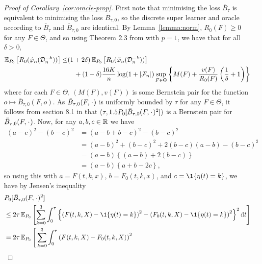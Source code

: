 \documentclass[a4,danish]{article}
\newcommand{\data}{\ensuremath{\mathcal{D}}}
\begin{document}
\begin{proof}[Proof of Corollary~\ref{cor:oracle-prop}]
  First note that minimising the loss \( \bar{B}_{\tau} \) is equivalent to
  minimising the loss \( \bar{B}_{\tau,0} \), so the discrete super learner and
  oracle according to \( \bar{B}_{\tau} \) and \( \bar{B}_{\tau,0} \) are
  identical. By Lemma~\ref{lemma:norm}, \( R_0(F) \geq 0 \) for any
  \( F \in \Theta \), and so using Theorem 2.3 from \citep{vaart2006oracle} with
  \( p=1 \), we have that for all \( \delta >0 \),
\begin{align*}
  \E_{P_0}{\left[ R_0(\hat{\phi}_n(\data_n^{-k})) \right]}
  \leq
  &(1+2\delta)\E_{P_0}{\left[ R_0(\tilde{\phi}_n(\data_n^{-k})) \right]}
  \\
  & \quad + (1+\delta) \frac{16 K}{n}
    \log(1 + |\mathcal{F}_n|)\sup_{F \in \Theta}
    \left\{
    M(F) + \frac{v(F)}{R_0(F)}
    \left(
    \frac{1}{\delta} + 1
    \right)
    \right\}
\end{align*}
where for each \( F \in \Theta \), \( (M(F), v(F)) \) is some Bernstein pair for
the function \(o \mapsto \bar{B}_{\tau,0}(F, o) \). As
\( \bar{B}_{\tau,0}(F, \blank) \) is uniformly bounded by \( \tau \) for any
\( F \in \Theta \), it follows from section 8.1 in \citep{vaart2006oracle} that
\( (\tau, 1.5 P_0{[\bar{B}_{\tau,0}(F, \blank)^2]}) \) is a Bernstein pair for
\( \bar{B}_{\tau,0}(F, \blank) \). Now, for any \( a,b,c \in \mathbb{R} \) we have
\begin{align*}
  (a-c)^2 - (b-c)^2
  & = (a-b+b-c)^2 - (b-c)^2
  \\
  & = (a-b)^2 + (b-c)^2 +2(b-c)(a-b) - (b-c)^2
  \\
  & = (a-b)
    \left\{
    (a-b) +  2(b-c)
    \right\}
  \\
  & = (a-b)
    \left\{
     a + b -2c
    \right\},
\end{align*}
so using this with \( a=F(t, k, x) \), \( b=F_0(t, k, x) \), and
\( c = \1{\{\eta(t) = k\}} \), we have by Jensen's inequality
\begin{align*}
  & P_0{[\bar{B}_{\tau,0}(F, \blank)^2]}
  \\
  & \leq
    2\tau\E_{P_0}{\left[
    \sum_{k=0}^{3} \int_0^{\tau}
    \left\{
    \left(
    F(t, k, X) - \1{\{\eta(t) = k\}}
    \right)^2
    -
    \left(
    F_0(t, k, X) - \1{\{\eta(t) = k\}}
    \right)^2
    \right\}^2
    \diff t 
    \right]}
  \\
  & =2\tau
    \E_{P_0}\Bigg[
    \sum_{k=0}^{3} \int_0^{\tau}
    \left(
    F(t, k, X) - F_0(t, k, X)
    \right)^2
  \\

\end{align*}
\end{proof}
\end{document}
